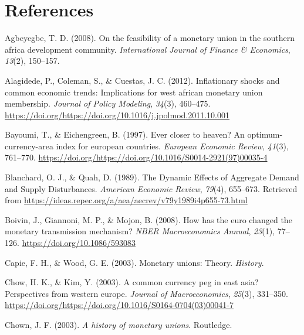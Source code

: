 \documentclass[]{article}
\begin{document}
\hypertarget{references}{%
\section*{References}\label{references}}

\noindent{}\parindent-1cm

\hypertarget{refs}{}
\leavevmode\hypertarget{ref-agbeyegbe2008feasibility}{}%
Agbeyegbe, T. D. (2008). On the feasibility of a monetary union in the southern africa development community. \emph{International Journal of Finance \& Economics}, \emph{13}(2), 150--157.

\leavevmode\hypertarget{ref-ALAGIDEDE2012460}{}%
Alagidede, P., Coleman, S., \& Cuestas, J. C. (2012). Inflationary shocks and common economic trends: Implications for west african monetary union membership. \emph{Journal of Policy Modeling}, \emph{34}(3), 460--475. \url{https://doi.org/https://doi.org/10.1016/j.jpolmod.2011.10.001}

\leavevmode\hypertarget{ref-BAYOUMI1997761}{}%
Bayoumi, T., \& Eichengreen, B. (1997). Ever closer to heaven? An optimum-currency-area index for european countries. \emph{European Economic Review}, \emph{41}(3), 761--770. \url{https://doi.org/https://doi.org/10.1016/S0014-2921(97)00035-4}

\leavevmode\hypertarget{ref-Blanchard1989}{}%
Blanchard, O. J., \& Quah, D. (1989). The Dynamic Effects of Aggregate Demand and Supply Disturbances. \emph{American Economic Review}, \emph{79}(4), 655--673. Retrieved from \url{https://ideas.repec.org/a/aea/aecrev/v79y1989i4p655-73.html}

\leavevmode\hypertarget{ref-Boivin2008}{}%
Boivin, J., Giannoni, M. P., \& Mojon, B. (2008). How has the euro changed the monetary transmission mechanism? \emph{NBER Macroeconomics Annual}, \emph{23}(1), 77--126. \url{https://doi.org/10.1086/593083}

\leavevmode\hypertarget{ref-capie2003monetary}{}%
Capie, F. H., \& Wood, G. E. (2003). Monetary unions: Theory. \emph{History}.

\leavevmode\hypertarget{ref-Chow2003}{}%
Chow, H. K., \& Kim, Y. (2003). A common currency peg in east asia? Perspectives from western europe. \emph{Journal of Macroeconomics}, \emph{25}(3), 331--350. \url{https://doi.org/https://doi.org/10.1016/S0164-0704(03)00041-7}

\leavevmode\hypertarget{ref-chown2003history}{}%
Chown, J. F. (2003). \emph{A history of monetary unions}. Routledge.
\end{document}
